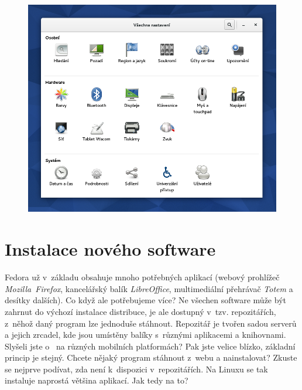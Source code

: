 \begin{figure}[t]
\begin{center}
\includegraphics[width=\textwidth]{img/nastaveni}
 \label{fig:nastaveni}
\end{center}
\end{figure}

\section*{Instalace nového software}
Fedora už v~základu obsahuje mnoho potřebných aplikací (webový prohlížeč \emph{Mozilla~Firefox}, kancelářský balík \emph{LibreOffice}, multimediální přehrávač \emph{Totem} a desítky dalších). Co když ale potřebujeme více? Ne všechen software může být zahrnut do výchozí instalace distribuce, je ale dostupný v~tzv. repozitářích, z~něhož daný program lze jednoduše stáhnout. Repozitář je tvořen sadou serverů a jejich zrcadel, kde jsou umístěny balíky s~různými aplikacemi a knihovnami. Slyšeli jste o~ na různých mobilních platformách? Pak jste velice blízko, základní princip je stejný. Chcete nějaký program stáhnout z~webu a nainstalovat? Zkuste se nejprve podívat, zda není k~dispozici v~repozitářích. Na Linuxu se tak instaluje naprostá většina aplikací. Jak tedy na to?


